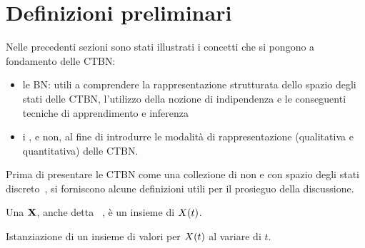 \section{Definizioni preliminari}
\label{sec:Definizioni preliminari}
Nelle precedenti sezioni sono stati illustrati i concetti che si pongono a fondamento delle \acl{CTBN}:
\begin{itemize}
    \item le \acl{BN}: utili a comprendere la rappresentazione strutturata dello spazio degli stati delle \acs{CTBN}, l'utilizzo della nozione di indipendenza \cond*{} e le conseguenti tecniche di apprendimento e inferenza
    \item i \mprocess{}, \omog{} e non, al fine di introdurre le modalità di rappresentazione (qualitativa e quantitativa) delle \acs{CTBN}.
\end{itemize}

Prima di presentare le \acl{CTBN} come una collezione di \ctmp{} non \omog{} e con spazio degli stati discreto~\citep{Nodelman2007}, si forniscono alcune definizioni utili per il prosieguo della discussione.

\begin{definizione}[\acl{PV}]\label{defn:pv}
    Una \pv{} $\mathbf{X}$, anche detta ~\citep{Nodelman2007}, è un insieme di \ctmp{} $\mathnormal{X}(t)$.
\end{definizione}

\begin{definizione}[Traiettoria]\label{defn:traiettoria}
    Istanziazione di un insieme di valori per $\mathnormal{X}(t)$ al variare di $t$.
\end{definizione}

